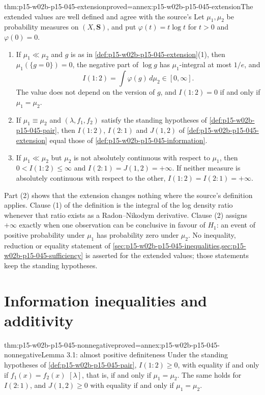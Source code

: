 \begin{hblemma}{thm:p15-w02b-p15-045-extension}{proved=annex:p15-w02b-p15-045-extension}{The extended values are well defined and agree with the source's}
Let \(\mu_1,\mu_2\) be probability measures on \((X,\mathbf S)\), and
put \(\varphi(t)=t\log t\) for \(t>0\) and \(\varphi(0)=0\).
\begin{enumerate}
\item If \(\mu_1\ll\mu_2\) and \(g\) is as in
\cref{def:p15-w02b-p15-045-extension}(1), then
\(\mu_1(\{g=0\})=0\), the negative part of \(\log g\) has
\(\mu_1\)-integral at most \(1/e\), and
\[
  I(1:2)=\int\varphi(g)\,d\mu_2\in[0,\infty].
\]
The value does not depend on the version of \(g\), and \(I(1:2)=0\) if
and only if \(\mu_1=\mu_2\).
\item If \(\mu_1\equiv\mu_2\) and \((\lambda,f_1,f_2)\) satisfy the
standing hypotheses of \cref{def:p15-w02b-p15-045-pair}, then
\(I(1:2)\), \(I(2:1)\) and \(J(1,2)\) of
\cref{def:p15-w02b-p15-045-extension} equal those of
\cref{def:p15-w02b-p15-045-information}.
\item If \(\mu_1\ll\mu_2\) but \(\mu_2\) is not absolutely continuous
with respect to \(\mu_1\), then \(0<I(1:2)\leq\infty\) and
\(I(2:1)=J(1,2)=+\infty\). If neither measure is absolutely continuous
with respect to the other, \(I(1:2)=I(2:1)=+\infty\).
\end{enumerate}
\end{hblemma}

Part (2) shows that the extension changes nothing where the source's
definition applies. Clause (1) of the definition is the integral of the
log density ratio whenever that ratio exists as a Radon--Nikodym
derivative. Clause (2) assigns \(+\infty\) exactly when one observation
can be conclusive in favour of \(H_1\): an event of positive probability
under \(\mu_1\) has probability zero under \(\mu_2\). No inequality,
reduction or equality statement of
\cref{sec:p15-w02b-p15-045-inequalities,sec:p15-w02b-p15-045-sufficiency}
is asserted for the extended values; those statements keep the standing
hypotheses.

\section{Information inequalities and additivity}
\label{sec:p15-w02b-p15-045-inequalities}

\begin{hblemma}{thm:p15-w02b-p15-045-nonnegative}{proved=annex:p15-w02b-p15-045-nonnegative}{Lemma 3.1: almost positive definiteness}
Under the standing hypotheses of \cref{def:p15-w02b-p15-045-pair},
\(I(1:2)\geq0\), with equality if and only if \(f_1(x)=f_2(x)\)
\([\lambda]\), that is, if and only if \(\mu_1=\mu_2\). The same holds
for \(I(2:1)\), and \(J(1,2)\geq0\) with equality if and only if
\(\mu_1=\mu_2\).
\end{hblemma}

